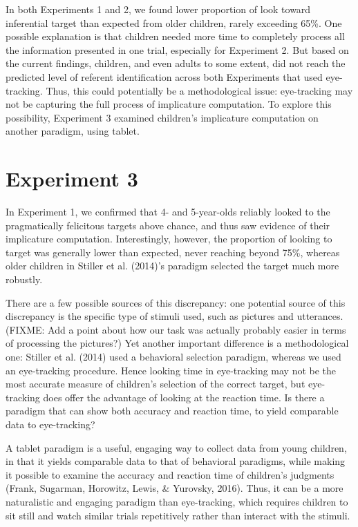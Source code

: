 \documentclass[a4paper,man,apacite,floatsintext]{apa6}
\begin{document}
In both Experiments 1 and 2, we found lower proportion of look toward
inferential target than expected from older children, rarely exceeding
65\%. One possible explanation is that children needed more time to
completely process all the information presented in one trial,
especially for Experiment 2. But based on the current findings,
children, and even adults to some extent, did not reach the predicted
level of referent identification across both Experiments that used
eye-tracking. Thus, this could potentially be a methodological issue:
eye-tracking may not be capturing the full process of implicature
computation. To explore this possibility, Experiment 3 examined
children's implicature computation on another paradigm, using tablet.

\section{Experiment 3}\label{experiment-3}

In Experiment 1, we confirmed that 4- and 5-year-olds reliably looked to
the pragmatically felicitous targets above chance, and thus saw evidence
of their implicature computation. Interestingly, however, the proportion
of looking to target was generally lower than expected, never reaching
beyond 75\%, whereas older children in Stiller et al. (2014)'s paradigm
selected the target much more robustly.

There are a few possible sources of this discrepancy: one potential
source of this discrepancy is the specific type of stimuli used, such as
pictures and utterances. (FIXME: Add a point about how our task was
actually probably easier in terms of processing the pictures?) Yet
another important difference is a methodological one: Stiller et al.
(2014) used a behavioral selection paradigm, whereas we used an
eye-tracking procedure. Hence looking time in eye-tracking may not be
the most accurate measure of children's selection of the correct target,
but eye-tracking does offer the advantage of looking at the reaction
time. Is there a paradigm that can show both accuracy and reaction time,
to yield comparable data to eye-tracking?

A tablet paradigm is a useful, engaging way to collect data from young
children, in that it yields comparable data to that of behavioral
paradigms, while making it possible to examine the accuracy and reaction
time of children's judgments (Frank, Sugarman, Horowitz, Lewis, \&
Yurovsky, 2016). Thus, it can be a more naturalistic and engaging
paradigm than eye-tracking, which requires children to sit still and
watch similar trials repetitively rather than interact with the stimuli.
\end{document}
